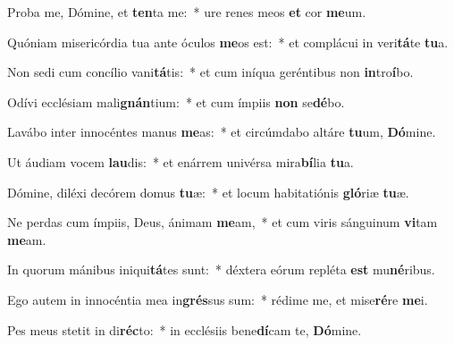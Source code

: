 \item Proba me, Dómine, et \textbf{ten}ta me:~* ure renes meos \textbf{et} cor \textbf{me}um.
\item Quóniam misericórdia tua ante óculos \textbf{me}os est:~* et complácui in veri\textbf{tá}te \textbf{tu}a.
\item Non sedi cum concílio vani\textbf{tá}tis:~* et cum iníqua geréntibus non \textbf{in}tro\textbf{í}bo.
\item Odívi ecclésiam mali\textbf{gnán}tium:~* et cum ímpiis \textbf{non} se\textbf{dé}bo.
\item Lavábo inter innocéntes manus \textbf{me}as:~* et circúmdabo altáre \textbf{tu}um, \textbf{Dó}mine.
\item Ut áudiam vocem \textbf{lau}dis:~* et enárrem univérsa mira\textbf{bí}lia \textbf{tu}a.
\item Dómine, diléxi decórem domus \textbf{tu}æ:~* et locum habitatiónis \textbf{gló}riæ \textbf{tu}æ.
\item Ne perdas cum ímpiis, Deus, ánimam \textbf{me}am,~* et cum viris sánguinum \textbf{vi}tam \textbf{me}am.
\item In quorum mánibus iniqui\textbf{tá}tes sunt:~* déxtera eórum repléta \textbf{est} mu\textbf{né}ribus.
\item Ego autem in innocéntia mea in\textbf{grés}sus sum:~* rédime me, et mise\textbf{ré}re \textbf{me}i.
\item Pes meus stetit in di\textbf{réc}to:~* in ecclésiis bene\textbf{dí}cam te, \textbf{Dó}mine.
